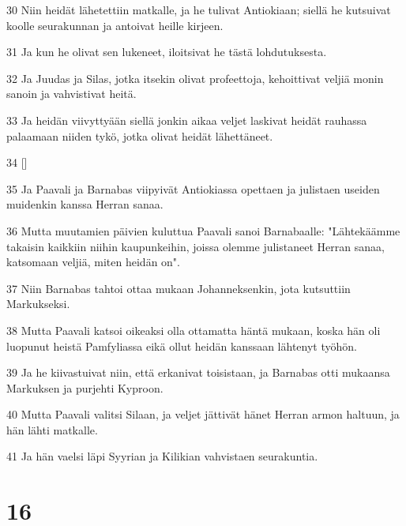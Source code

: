 \par 30 Niin heidät lähetettiin matkalle, ja he tulivat Antiokiaan; siellä he kutsuivat koolle seurakunnan ja antoivat heille kirjeen.
\par 31 Ja kun he olivat sen lukeneet, iloitsivat he tästä lohdutuksesta.
\par 32 Ja Juudas ja Silas, jotka itsekin olivat profeettoja, kehoittivat veljiä monin sanoin ja vahvistivat heitä.
\par 33 Ja heidän viivyttyään siellä jonkin aikaa veljet laskivat heidät rauhassa palaamaan niiden tykö, jotka olivat heidät lähettäneet.
\par 34 []
\par 35 Ja Paavali ja Barnabas viipyivät Antiokiassa opettaen ja julistaen useiden muidenkin kanssa Herran sanaa.
\par 36 Mutta muutamien päivien kuluttua Paavali sanoi Barnabaalle: "Lähtekäämme takaisin kaikkiin niihin kaupunkeihin, joissa olemme julistaneet Herran sanaa, katsomaan veljiä, miten heidän on".
\par 37 Niin Barnabas tahtoi ottaa mukaan Johanneksenkin, jota kutsuttiin Markukseksi.
\par 38 Mutta Paavali katsoi oikeaksi olla ottamatta häntä mukaan, koska hän oli luopunut heistä Pamfyliassa eikä ollut heidän kanssaan lähtenyt työhön.
\par 39 Ja he kiivastuivat niin, että erkanivat toisistaan, ja Barnabas otti mukaansa Markuksen ja purjehti Kyproon.
\par 40 Mutta Paavali valitsi Silaan, ja veljet jättivät hänet Herran armon haltuun, ja hän lähti matkalle.
\par 41 Ja hän vaelsi läpi Syyrian ja Kilikian vahvistaen seurakuntia.

\chapter{16}

